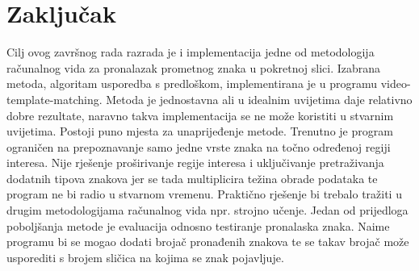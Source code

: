 \newpage
\setcounter{figure}{0}

\section{Zaključak} %
\label{sec:Zaključak}

Cilj ovog završnog rada razrada je i implementacija jedne od
metodologija računalnog vida za pronalazak prometnog znaka u pokretnoj
slici. Izabrana metoda, algoritam usporedba s predloškom, implementirana
je u programu video-template-matching. Metoda je jednostavna ali u
idealnim uvijetima daje relativno dobre rezultate, naravno takva
implementacija se ne može koristiti u stvarnim uvijetima. Postoji puno
mjesta za unaprijeđenje metode. Trenutno je program ograničen na
prepoznavanje samo jedne vrste znaka na točno određenoj regiji interesa.
Nije rješenje proširivanje regije interesa i uključivanje pretraživanja
dodatnih tipova znakova jer se tada multiplicira težina obrade podataka
te program ne bi radio u stvarnom vremenu. Praktično rješenje bi trebalo
tražiti u drugim metodologijama računalnog vida npr. strojno učenje.
Jedan od prijedloga poboljšanja metode je evaluacija odnosno testiranje
pronalaska znaka. Naime programu bi se mogao dodati brojač pronađenih
znakova te se takav brojač može usporediti s brojem sličica na kojima se
znak pojavljuje.

